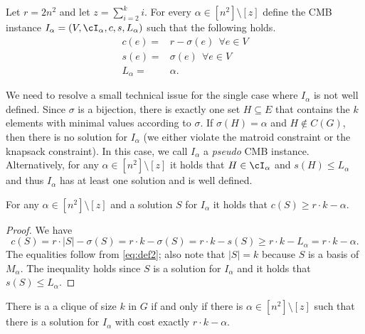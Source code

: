{	%
	Let $r = 2n^2$ and let $z = \sum^{k}_{i = 2} i $. %
	For every ${\alpha} \in  [n^2] \setminus [z]$ define the CMB instance $I_{\alpha} = (V,\cI_{\alpha},c,s,L_{\alpha})$ such that the following holds. \begin{equation}
		\label{eq:def2}
		\begin{aligned}
			c(e) ={} &  r-\sigma(e)  ~~\forall e \in V \\
			s(e) ={} & \sigma(e)~~\forall e \in V \\
			L_{\alpha} ={} &  \alpha. 
		\end{aligned}
	\end{equation}
	
	We need to resolve a small technical issue for the single case where $I_{\alpha}$ is not well defined. Since $\sigma$ is a bijection, there is exactly one set $H \subseteq E$ that contains the $k$ elements with minimal values according to $\sigma$. If $\sigma(H) = \alpha$ and $H \notin C(G)$, then there is no solution for $I_{\alpha}$ (we either violate the matroid constraint or the knapsack constraint). In this case, we call $I_{\alpha}$ a {\em pseudo} CMB instance. 
	Alternatively, for any $\alpha \in [n^2] \setminus [z]$ it holds that $H \in \cI_{\alpha}$ and $s(H) \leq L_{\alpha}$ and thus $I_{\alpha}$ has at least one solution and is well defined. %
	
	
	
	
	
	\begin{claim}
		\label{claim:alpha2}
		For any $\alpha \in [n^2] \setminus [z]$ and a solution $S$ for $I_{\alpha}$ it holds that $c(S) \geq r \cdot k-\alpha$. 
	\end{claim}
	
	\begin{proof}
		We have
		$$c(S) = r \cdot |S|-\sigma(S)  = r \cdot k-\sigma(S) = r \cdot k-s(S) \geq r \cdot k -L_{\alpha} = r \cdot k -\alpha.$$ The equalities follow from \eqref{eq:def2}; also note that $|S| = k$ because $S$ is a basis of $M_{\alpha}$. The inequality holds since $S$ is a solution for $I_{\alpha}$ and it holds that $s(S) \leq L_{\alpha}$. 
	\end{proof}
	
	
	
	\begin{claim}
		\label{claim:iff2}
		There is a a clique of size $k$ in $G$ if and only if there is $\alpha \in [n^2] \setminus [z]$ such that there is a solution for $I_{\alpha}$ with cost exactly $r \cdot k-\alpha$. 
	\end{claim}
	
}

